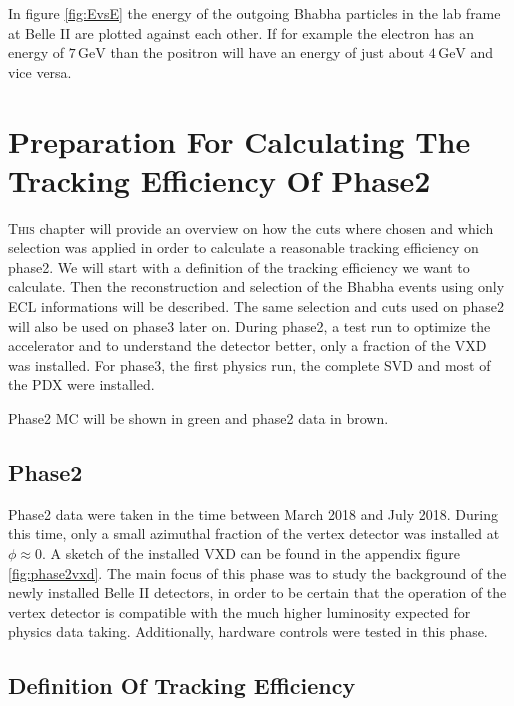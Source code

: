 \documentclass[a4paper,11pt,twosided,final,german,openbib,pdftex,listof=totoc,bibliography=totoc]{scrbook}
\begin{document}
In figure \ref{fig:EvsE} the energy of the outgoing Bhabha particles in the lab frame at Belle II are plotted against each other. If for example the electron has an energy of $7\,\textrm{GeV}$ than the positron will have an energy of just about $4\,\textrm{GeV}$ and vice versa.












\chapter{Preparation  For Calculating The Tracking Efficiency Of Phase2}
\label{chap:Phase2Eff}

\lettrine{T}{his} chapter will provide an overview on how the cuts where chosen and which selection was applied in order to calculate a reasonable tracking efficiency on phase2.
We will start with a definition of the tracking efficiency we want to calculate. Then the reconstruction and selection of the Bhabha events using only ECL informations will be described. The same selection and cuts used on phase2 will also be used on phase3 later on.
During phase2, a test run to optimize the accelerator and to understand the detector better, only a fraction of the VXD was installed. For phase3, the first physics run, the complete SVD and most of the PDX were installed.

Phase2 MC will be shown in green and phase2 data in brown.

\section{Phase2}
\label{sec:Phase2}

Phase2 data were taken in the time between March 2018 and July 2018. During this time, only a small azimuthal fraction of the vertex detector was installed at $\phi \approx 0$. A sketch of the installed VXD can be found in the appendix figure \ref{fig:phase2vxd}. The main focus of this phase was to study the background of the newly installed Belle II detectors, in order to be certain that the operation of the vertex detector is compatible with the much higher luminosity expected for physics data taking. Additionally, hardware controls were tested in this phase.


\section{Definition Of Tracking Efficiency}
\label{sec:Eff}
\end{document}
